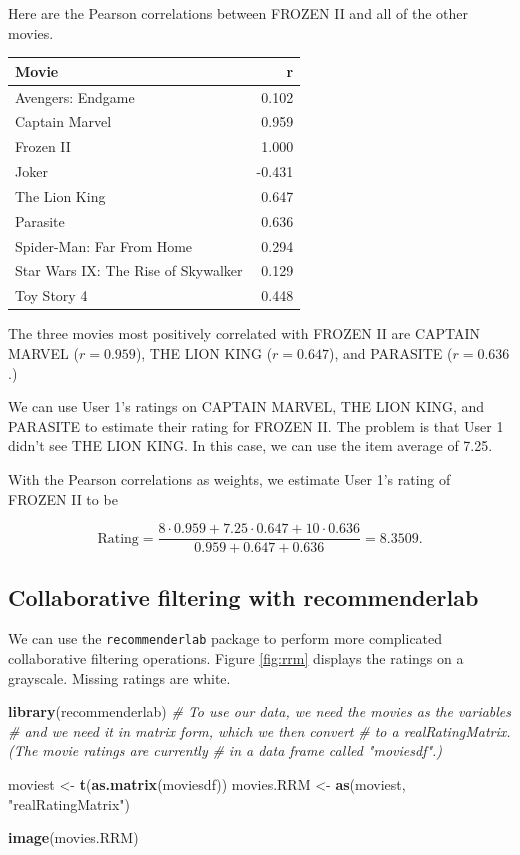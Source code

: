 \documentclass[
]{book}
\newenvironment{Shaded}{\begin{snugshade}}{\end{snugshade}}
\newcommand{\CommentTok}[1]{\textcolor[rgb]{0.56,0.35,0.01}{\textit{#1}}}
\newcommand{\FunctionTok}[1]{\textcolor[rgb]{0.13,0.29,0.53}{\textbf{#1}}}
\newcommand{\NormalTok}[1]{#1}
\newcommand{\OtherTok}[1]{\textcolor[rgb]{0.56,0.35,0.01}{#1}}
\newcommand{\StringTok}[1]{\textcolor[rgb]{0.31,0.60,0.02}{#1}}
\theoremstyle{definition}
\theoremstyle{definition}
\theoremstyle{definition}
\theoremstyle{definition}
\theoremstyle{remark}
\begin{document}
Here are the Pearson correlations between FROZEN II and all of the other movies.

\begin{longtable}{lr}
\toprule
Movie & r\\
\midrule
Avengers: Endgame & 0.102\\
Captain Marvel & 0.959\\
Frozen II & 1.000\\
Joker & -0.431\\
The Lion King & 0.647\\
Parasite & 0.636\\
Spider-Man: Far From Home & 0.294\\
Star Wars IX: The Rise of Skywalker & 0.129\\
Toy Story 4 & 0.448\\
\bottomrule
\end{longtable}

The three movies most positively correlated with FROZEN II are CAPTAIN MARVEL (\(r=0.959\)), THE LION KING (\(r=0.647\)), and PARASITE (\(r=0.636\).)

We can use User 1's ratings on CAPTAIN MARVEL, THE LION KING, and PARASITE to estimate their rating for FROZEN II. The problem is that User 1 didn't see THE LION KING. In this case, we can use the item average of 7.25.

With the Pearson correlations as weights, we estimate User 1's rating of FROZEN II to be

\[\text{Rating}=\frac{8\cdot 0.959+7.25\cdot 0.647+10\cdot 0.636}{0.959+0.647+0.636}=8.3509.\]

\subsection*{Collaborative filtering with recommenderlab}\label{collaborative-filtering-with-recommenderlab}

We can use the \texttt{recommenderlab} package to perform more complicated collaborative filtering operations. Figure \ref{fig:rrm} displays the ratings on a grayscale. Missing ratings are white.

\begin{Shaded}
\begin{Highlighting}[]
\FunctionTok{library}\NormalTok{(recommenderlab)}
\CommentTok{\# To use our data, we need the movies as the variables}
\CommentTok{\# and we need it in matrix form, which we then convert}
\CommentTok{\# to a realRatingMatrix. (The movie ratings are currently}
\CommentTok{\# in a data frame called "moviesdf".)}

\NormalTok{moviest }\OtherTok{\textless{}{-}} \FunctionTok{t}\NormalTok{(}\FunctionTok{as.matrix}\NormalTok{(moviesdf))}
\NormalTok{movies.RRM }\OtherTok{\textless{}{-}} \FunctionTok{as}\NormalTok{(moviest, }\StringTok{"realRatingMatrix"}\NormalTok{)}

\FunctionTok{image}\NormalTok{(movies.RRM)}
\end{Highlighting}
\end{Shaded}
\end{document}
